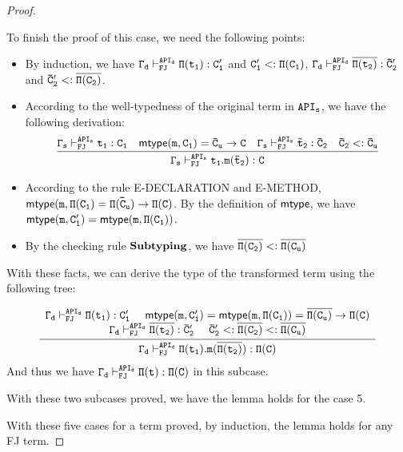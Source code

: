 \documentclass[letterpaper]{article}
\newcommand{\env}[2]{\vdash_{#1}^{#2}}
\begin{document}
\begin{proof}
\begin{itemize}
\begin{itemize}
    To finish the proof of this case, we need the following points:
    \begin{itemize}
      \item By induction, we have $\tt \Gamma_d\env{FJ}{API_d}\Pi(t_1):C'_1$ and $\tt C'_1<:\Pi(C_1)$, $\tt \Gamma_d\env{FJ}{API_d}\overline{\Pi(t_2)}:\bar{C}'_2$ and $\tt \bar{C}'_2 <: \overline{\Pi(C_2)}$.
      \item According to the well-typedness of the original term in $\tt API_s$, we have the following derivation:
        \[
          \begin{array}{ccc}
            \infer
            { \tt \Gamma_s\env{FJ}{API_s}t_1.m(\bar{t}_2):C}
            {
               \tt \Gamma_s\env{FJ}{API_s}t_1:C_1
              &\tt \mathsf{mtype}(m,C_1)=\bar{C}_u\rightarrow C
              &\tt \Gamma_s\env{FJ}{API_s}\bar{t}_2:\bar{C}_2
              &\tt \bar{C}_2 <:\bar{C}_u
            }
          \end{array}
        \]
      \item According to the rule E-DECLARATION and E-METHOD, $\tt\mathsf{mtype}(m, \Pi(C_1)=\bar{\Pi(C_u)}\rightarrow \Pi(C)$. By the definition of $\tt\mathsf{mtype}$, we have $\tt \mathsf{mtype}(m,C'_1)=\mathsf{mtype}(m,\Pi(C_1))$.
      \item By the checking rule $\tt \mathbf{Subtyping}$, we have $\tt \overline{\Pi(C_2)}<:\overline{\Pi(C_u)}$
    \end{itemize}

    With these facts, we can derive the type of the transformed term using the following tree:

    \[
      \begin{array}{ccc}
        \infer
        {\tt \Gamma_d\env{FJ}{API_d}\Pi(t_1).m(\overline{\Pi(t_2)}):\Pi(C)}
        {
          \begin{array}{cc}
        \tt \Gamma_d\env{FJ}{API_d}\Pi(t_1):C'_1 ~~~~
        \tt \mathsf{mtype}(m, C'_1)=\mathsf{mtype}(m, \Pi(C_1))=\overline{\Pi(C_u)}\rightarrow\Pi(C)\\
        \tt \Gamma_d\env{FJ}{API_d}\overline{\Pi(t_2)}:\bar{C}'_2~~~~
        \tt \bar{C}'_2<:\overline{\Pi(C_2)}<:\overline{\Pi(C_u)}
          \end{array}
        }
      \end{array}
    \]
    And thus we have $\tt \Gamma_d\env{FJ}{API_d}\Pi(t):\Pi(C)$ in this subcase.
  \end{itemize}
  With these two subcases proved, we have the lemma holds for the case 5.
\end{itemize}
With these five cases for a term proved, by induction, the lemma holds for any FJ term.
\end{proof}
\end{document}

